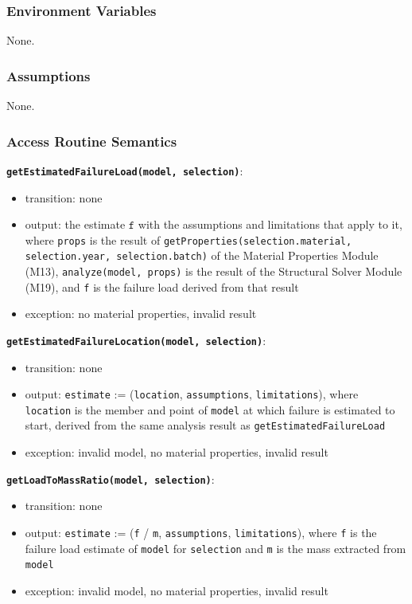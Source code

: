 \documentclass[12pt, titlepage]{article}
\begin{document}
\subsubsection{Environment Variables}
None.

\subsubsection{Assumptions}
None.

\subsubsection{Access Routine Semantics}

\textbf{\texttt{getEstimatedFailureLoad(model, selection)}}:
\begin{itemize}
  \item transition: none
  \item output: the estimate $\texttt{f}$ with the assumptions and limitations that apply to it, where \texttt{props} is the result of \texttt{getProperties(selection.material, selection.year, selection.batch)} of the Material Properties Module (M13), \texttt{analyze(model, props)} is the result of the Structural Solver Module (M19), and \texttt{f} is the failure load derived from that result
  \item exception: no material properties, invalid result
\end{itemize}

\textbf{\texttt{getEstimatedFailureLocation(model, selection)}}:
\begin{itemize}
  \item transition: none
  \item output: \texttt{estimate} := (\texttt{location}, \texttt{assumptions}, \texttt{limitations}), where \texttt{location} is the member and point of \texttt{model} at which failure is estimated to start, derived from the same analysis result as \texttt{getEstimatedFailureLoad}
  \item exception: invalid model, no material properties, invalid result
\end{itemize}

\textbf{\texttt{getLoadToMassRatio(model, selection)}}:
\begin{itemize}
  \item transition: none
  \item output: \texttt{estimate} := (\texttt{f} / \texttt{m}, \texttt{assumptions}, \texttt{limitations}), where \texttt{f} is the failure load estimate of \texttt{model} for \texttt{selection} and \texttt{m} is the mass extracted from \texttt{model}
  \item exception: invalid model, no material properties, invalid result
\end{itemize}
\end{document}
